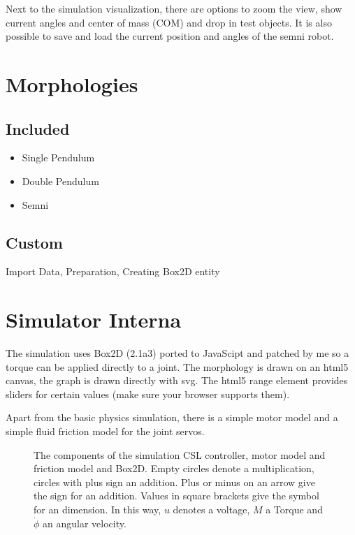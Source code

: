 \documentclass[10pt,a4paper]{article}
\begin{document}
Next to the simulation visualization, there are options to zoom the view, show current angles and
center of mass (COM) and drop in test objects. It is also possible to save and load the current
position and angles of the semni robot.

\section{Morphologies}
\subsection{Included}
\begin{itemize}
\item Single Pendulum
\item Double Pendulum
\item Semni
\end{itemize}

\subsection{Custom}

Import Data, Preparation, Creating Box2D entity

\section{Simulator Interna}
\label{sim_internal}

The simulation uses Box2D (2.1a3) ported to JavaScipt and patched by me so a torque
can be applied directly to a joint.
The morphology is drawn on an html5 canvas, the graph is drawn directly with svg.
The html5 range element provides sliders for certain values (make sure your browser supports them).

Apart from the basic physics simulation, there is a simple motor model and a simple fluid friction
model for the joint servos.

\begin{figure}[H]
    \centering
    
    \caption{The components of the simulation CSL controller, motor model and
    friction model and Box2D. Empty circles denote a multiplication, circles with plus sign
    an addition. Plus or minus on an arrow give the sign for an addition.
    Values in square brackets give the symbol for an dimension. In this way, $u$ denotes
    a voltage, $M$ a Torque and $\dot{\phi}$ an angular velocity.}
    \label{fig:controllermodell}
\end{figure}
\end{document}
